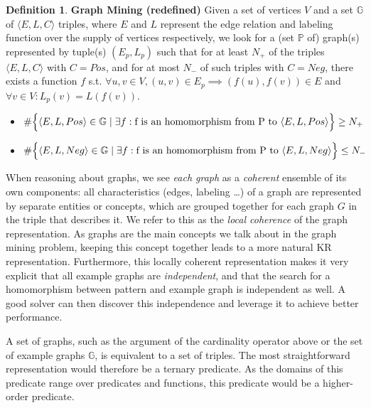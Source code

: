 \documentclass{article}
\theoremstyle{definition}
\newtheorem{definition}{Definition}[section]
\newcommand{\triple}[1]{\ensuremath{\langle #1 \rangle}}
\newcommand{\pair}[1]{\ensuremath{\left(#1\right)}}
\newcommand{\graphset}[1]{\ensuremath{\mathbb{#1}}}
\begin{document}
\begin{definition} \textbf{Graph Mining (redefined)}
  \label{def:gm2}
  Given a set of vertices $V$ and a set $\graphset{G}$ of $\triple{E, L, C}$ triples,
  where $E$ and $L$ represent the edge relation and labeling function over the supply of vertices respectively,
  we look for a (set $\graphset{P}$ of)  graph(s) represented by tuple(s) $\pair{E_{p}, L_{p}}$ such that
  for at least $N_{+}$ of the triples $\triple{ E, L, C}$ with $C=Pos$, and for at most $N_{-}$ of such triples with $C=Neg$, there exists a function $f$ s.t. $\forall u,v \in V, \pair{u,v} \in E_{p} \implies \pair{f(u),f(v)} \in E$ and $\forall v \in V : L_{p}(v) = L(f(v))$.

  \begin{itemize}
    \item $\#\Big\lbrace \triple{E,L,Pos} \in \graphset{G} \; | \; \exists f : \text{f is an homomorphism from P to \triple{E,L,Pos}} \Big\rbrace \geq N_{+}$

    \item $\#\Big\lbrace \triple{E,L,Neg} \in \graphset{G} \; | \; \exists f : \text{f is an homomorphism from P to \triple{E,L,Neg}} \Big\rbrace \leq N_{-}$
  \end{itemize}
\end{definition}

When reasoning about graphs, we see \emph{each graph} as a \emph{coherent} ensemble of its own components: 
all characteristics (edges, labeling \ldots) of a graph are represented by separate entities or concepts, which are grouped together for each graph $G$ in the triple that describes it.
We refer to this as the \emph{local coherence} of the graph representation.
As graphs are the main concepts we talk about in the graph mining problem, keeping this concept together leads to a more natural KR representation.
Furthermore, this locally coherent representation makes it very explicit that all example graphs are \emph{independent}, and that the search for a homomorphism between pattern and example graph is independent as well.
A good solver can then discover this independence and leverage it to achieve better performance.

A set of graphs, such as the argument of the cardinality operator above or the set of example graphs $\graphset{G}$, is equivalent to a set of triples.
The most straightforward representation would therefore be a ternary predicate.
As the domains of this predicate range over predicates and functions, this predicate would be a higher-order predicate.
\end{document}
